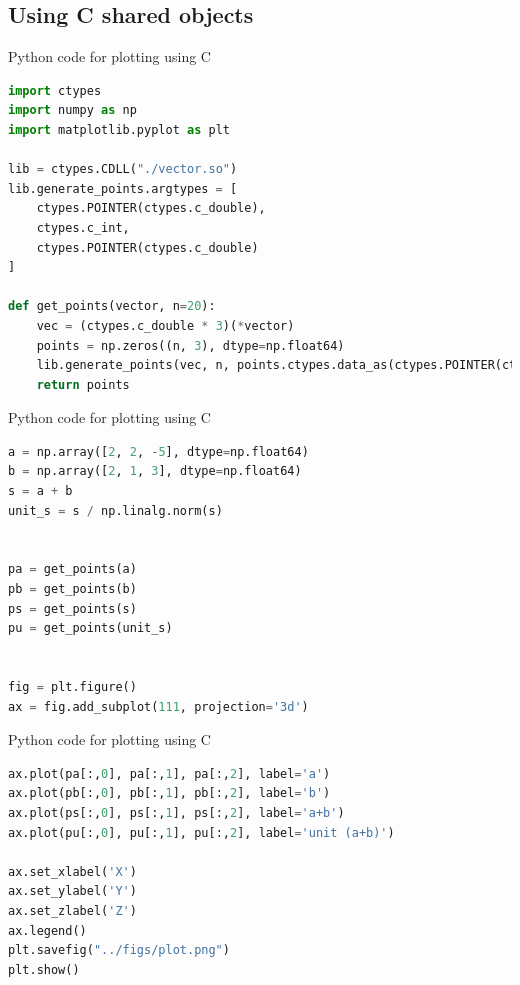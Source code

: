 \documentclass{beamer}
\theoremstyle{remark}
\numberwithin{equation}{section}
\begin{document}
\subsection{Using C shared objects}
\begin{frame}[fragile]{Python code for plotting using C}
\begin{lstlisting}[language=Python]
import ctypes
import numpy as np
import matplotlib.pyplot as plt

lib = ctypes.CDLL("./vector.so")
lib.generate_points.argtypes = [
    ctypes.POINTER(ctypes.c_double),
    ctypes.c_int,
    ctypes.POINTER(ctypes.c_double)
]

def get_points(vector, n=20):
    vec = (ctypes.c_double * 3)(*vector)
    points = np.zeros((n, 3), dtype=np.float64)
    lib.generate_points(vec, n, points.ctypes.data_as(ctypes.POINTER(ctypes.c_double)))
    return points
    \end{lstlisting}
\end{frame}
\begin{frame}[fragile]{Python code for plotting using C}
\begin{lstlisting}[language=Python]
a = np.array([2, 2, -5], dtype=np.float64)
b = np.array([2, 1, 3], dtype=np.float64)
s = a + b
unit_s = s / np.linalg.norm(s)


pa = get_points(a)
pb = get_points(b)
ps = get_points(s)
pu = get_points(unit_s)


fig = plt.figure()
ax = fig.add_subplot(111, projection='3d')


\end{lstlisting}
\end{frame}
\begin{frame}[fragile]{Python code for plotting using C}
\begin{lstlisting}[language=Python]
ax.plot(pa[:,0], pa[:,1], pa[:,2], label='a')
ax.plot(pb[:,0], pb[:,1], pb[:,2], label='b')
ax.plot(ps[:,0], ps[:,1], ps[:,2], label='a+b')
ax.plot(pu[:,0], pu[:,1], pu[:,2], label='unit (a+b)')

ax.set_xlabel('X')
ax.set_ylabel('Y')
ax.set_zlabel('Z')
ax.legend()
plt.savefig("../figs/plot.png")
plt.show()
\end{lstlisting}
\end{frame}
\end{document}
